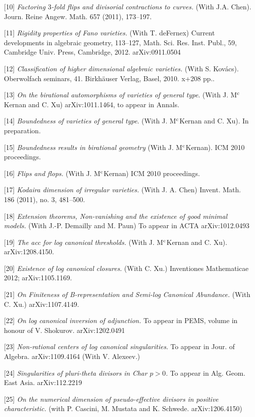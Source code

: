 \documentclass[12pt] {amsart}
\begin{document}
[10] {\it Factoring $3$-fold flips and  divisorial contractions to curves.}
(With J.A. Chen). Journ. Reine Angew. Math. 657 (2011), 173–197.

[11] {\it Rigidity properties of Fano varieties.} (With T. deFernex) Current developments in algebraic geometry, 113–127, Math. Sci. Res. Inst. Publ., 59, Cambridge Univ. Press, Cambridge, 2012. arXiv:0911.0504

[12] {\it Classification of higher dimensional algebraic varieties.}
(With S. Kov\'acs). Oberwolfach seminars, 41. Birkhäuser Verlag, Basel, 2010. x+208 pp..

[13] {\it On the birational automorphisms of varieties of general type}.
(With J. M$^{\rm c}$Kernan and C. Xu) arXiv:1011.1464, to appear in Annals.

[14] {\it Boundedness of varieties of general type}.
(With J. M$^{\rm c}$Kernan and C. Xu). In preparation.

[15] {\it Boundedness results in birational geometry}
(With J. M$^{\rm c}$Kernan). ICM 2010 proceedings.

[16] {\it Flips and flops.} (With J. M$^{\rm c}$Kernan) ICM 2010 proceedings.

[17] {\it Kodaira dimension of irregular varieties.} (With J. A. Chen)  Invent. Math. 186 (2011), no. 3, 481--500.

[18] {\it Extension theorems, Non-vanishing and the existence of good minimal models.} (With J.-P. Demailly and M. Paun) To appear in ACTA	arXiv:1012.0493

[19] {\it The acc for log canonical thresholds.} (With J. M$^{\rm c}$Kernan and C. Xu).  arXiv:1208.4150.

[20] {\it Existence of log canonical closures.} (With C. Xu.)  Inventiones Mathematicae 2012; arXiv:1105.1169.

[21] {\it On Finiteness of B-representation and Semi-log Canonical Abundance.} (With C. Xu.) arXiv:1107.4149.

[22] {\it On log canonical inversion of adjunction.} To appear in PEMS, volume in honour of V. Shokurov. arXiv:1202.0491

[23] {\it Non-rational centers of log canonical singularities.} To appear in Jour. of Algebra. arXiv:1109.4164 (With V. Alexeev.) 

[24] {\it Singularities of pluri-theta divisors in Char $p>0$.} To appear in Alg. Geom. East Asia.  arXiv:112.2219

[25] {\it On the numerical dimension of pseudo-effective divisors in positive characteristic.} (with P. Cascini, M. Mustata and K. Schwede. arXiv:1206.4150)
\end{document}
